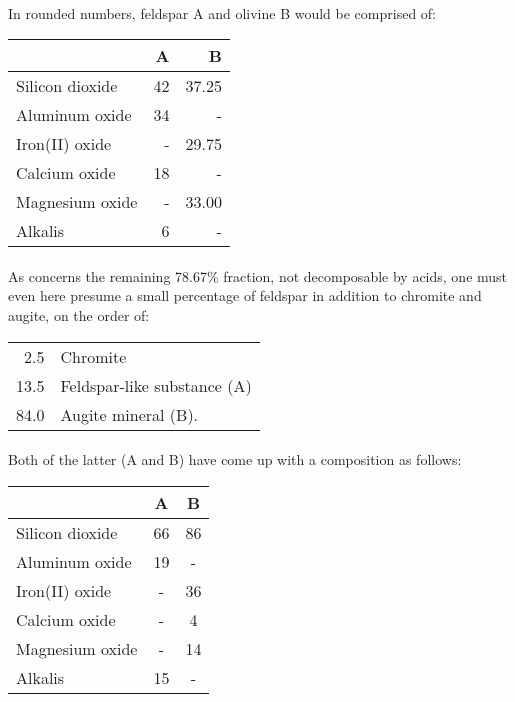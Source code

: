 \documentclass[a4paper, 12pt, oneside]{article}
\begin{document}
\paragraph*{}
In rounded numbers, feldspar A and olivine B would be comprised of:
\begin{center}
    \begin{tabular}{|l|r|r|}
        \hline
        & A & B\\\hline
        Silicon dioxide & 42 & 37.25\\\hline
        Aluminum oxide & 34 & -\\\hline
        Iron(II) oxide & - & 29.75\\\hline
        Calcium oxide & 18 & -\\\hline
        Magnesium oxide & - & 33.00\\\hline
        Alkalis & 6 & -\\
        \hline
    \end{tabular}
\end{center}
\paragraph*{}
As concerns the remaining 78.67\% fraction, not decomposable by acids, one must even here presume a small percentage of feldspar in addition to chromite and augite, on the order of:
\begin{center}
    \begin{tabular}{r l}
        2.5 & Chromite\\
        13.5 & Feldspar-like substance (A)\\
        84.0 & Augite mineral (B).\\
    \end{tabular}
\end{center}
\paragraph*{}
Both of the latter (A and B) have come up with a composition as follows:
\begin{center}
    \begin{tabular}{|l|c|c|}
        \hline
        & A & B\\\hline
        Silicon dioxide & 66 & 86\\\hline
        Aluminum oxide & 19 & -\\\hline
        Iron(II) oxide & - & 36\\\hline
        Calcium oxide & - & 4\\\hline
        Magnesium oxide & - & 14\\\hline
        Alkalis & 15 & -\\
        \hline
    \end{tabular}
\end{center}
\end{document}
